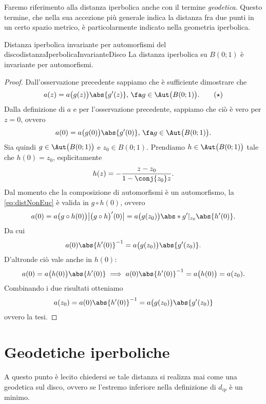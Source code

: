 \begin{notz}
	Faremo riferimento alla distanza iperbolica anche con il termine \emph{geodetica}. Questo termine, che nella sua accezione più generale indica la distanza fra due punti in un certo spazio metrico, è particolarmente indicato nella geometria iperbolica.
\end{notz}

\begin{teor}{Distanza iperbolica invariante per automorfismi del disco}{distanzaIperbolicaInvarianteDisco}
	La distanza iperbolica su \(B(0;1)\) è invariante per automorfismi.
\end{teor}

\begin{proof}
	Dall'osservazione precedente sappiamo che è sufficiente dimostrare che
	\begin{equation*}\label{eq:distNonEuc}
		a(z) = a\big(g(z)\big)\abs{g'(z)},\,\fa g\in\Aut\big(B(0;1)\big).\tag{\(\star\)}
	\end{equation*}
	Dalla definizione di \(a\) e per l'osservazione precedente, sappiamo che ciò è vero per \(z=0\), ovvero
	\[
		a(0)=a\big(g(0)\big)\abs{g'(0)},\,\fa g\in\Aut\big(B(0;1)\big).
	\]
	Sia quindi \(g\in \Aut\big(B(0;1)\big)\) e \(z_0\in B(0;1)\). Prendiamo \(h\in\Aut\big(B(0;1)\big)\) tale che \(h(0)=z_0\), esplicitamente
	\[
		h(z) = - \frac{z-z_0}{1-\conj{z_0}z}.
	\]
	Dal momento che la composizione di automorfismi è un automorfismo, la \eqref{eq:distNonEuc} è valida in \(g\circ h(0)\), ovvero
	\[
		a(0) = a\big(g\circ h(0)\big) \big\lvert \big(g\circ h\big)'(0)\big\rvert = a\big(g(z_0)\big) \abs*{g'|_{z_0}}\abs{h'(0)}.
	\]
	Da cui
	\[
		a(0)\abs{h'(0)}^{-1} = a\big(g(z_0)\big) \abs{g'(z_0)}.
	\]
	D'altronde ciò vale anche in \(h(0)\):
	\[
		a(0) = a\big(h(0)\big)\abs{h'(0)} \implies a(0)\abs{h'(0)}^{-1} = a\big(h(0)\big) = a(z_0).
	\]
	Combinando i due risultati otteniamo
	\[
		a(z_0) = a(0) \abs{h'(0)}^{-1} = a\big(g(z_0)\big)\abs{g'(z_0)}
	\]
	ovvero la tesi.
\end{proof}
%
%
\section{Geodetiche iperboliche}

A questo punto è lecito chiedersi se tale distanza si realizza mai come una geodetica sul disco, ovvero se l'estremo inferiore nella definizione di \(d_{ip}\) è un minimo.

